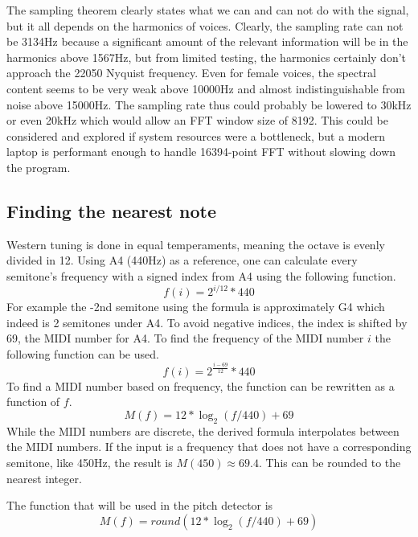 The sampling theorem clearly states what we can and can not do with the signal, but it all depends on the harmonics of voices. Clearly, the sampling rate can not be 3134Hz because a significant amount of the relevant information will be in the harmonics above 1567Hz, but from limited testing, the harmonics certainly don't approach the 22050 Nyquist frequency. Even for female voices, the spectral content seems to be very weak above 10000Hz and almost indistinguishable from noise above 15000Hz. The sampling rate thus could probably be lowered to 30kHz or even 20kHz which would allow an FFT window size of 8192. This could be considered and explored if system resources were a bottleneck, but a modern laptop is performant enough to handle 16394-point FFT without slowing down the program.

\subsection{Finding the nearest note}
Western tuning is done in equal temperaments, meaning the octave is evenly divided in 12. Using A4 (440Hz) as a reference, one can calculate every semitone's frequency with a signed index from A4 using the following function. 
$$f(i) = 2^{i/12}*440$$
For example the -2nd semitone using the formula is approximately G4 which indeed is 2 semitones under A4. To avoid negative indices, the index is shifted by 69, the MIDI number for A4. To find the frequency of the MIDI number $i$ the following function can be used.
$$f(i) = 2^{\frac{i-69}{12}}*440$$
To find a MIDI number based on frequency, the function can be rewritten as a function of $f$.
$$M(f) = 12*\log_2(f/440)+69$$
While the MIDI numbers are discrete, the derived formula interpolates between the MIDI numbers. If the input is a frequency that does not have a corresponding semitone, like 450Hz, the result is $M(450) \approx 69.4$. This can be rounded to the nearest integer.

The function that will be used in the pitch detector is
$$M(f) = round(12*\log_2(f/440)+69)$$

